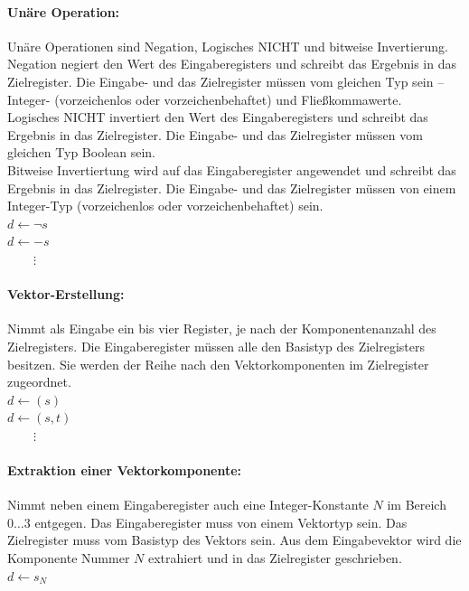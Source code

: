 \documentclass[twoside,a4paper,fleqn,12pt]{article}
\begin{document}
\paragraph{Unäre Operation:} Unäre Operationen sind Negation, Logisches NICHT und bitweise Invertierung.
Negation negiert den Wert des Eingaberegisters und schreibt das Ergebnis in das Zielregister.
Die Eingabe- und das Zielregister müssen vom gleichen Typ sein -- Integer- (vorzeichenlos oder vorzeichenbehaftet) und Fließkommawerte.\\
Logisches NICHT invertiert den Wert des Eingaberegisters und schreibt das Ergebnis in das Zielregister.
Die Eingabe- und das Zielregister müssen vom gleichen Typ Boolean sein.\\
Bitweise Invertiertung wird auf das Eingaberegister angewendet und schreibt das Ergebnis in das Zielregister.
Die Eingabe- und das Zielregister müssen von einem Integer-Typ (vorzeichenlos oder vorzeichenbehaftet) sein.
\\\hspace*{1cm}$d \gets \neg s$
\\\hspace*{1cm}$d \gets -s$
\\\hspace*{1cm}$\phantom{d \gets}\vdots$

\paragraph{Vektor-Erstellung:} Nimmt als Eingabe ein bis vier Register, je nach der Komponentenanzahl des Zielregisters. Die Eingaberegister müssen alle
den Basistyp des Zielregisters besitzen. Sie werden der Reihe nach den Vektorkomponenten im Zielregister zugeordnet.
\\\hspace*{1cm}$d \gets (s)$
\\\hspace*{1cm}$d \gets (s, t)$
\\\hspace*{1cm}$\phantom{d \gets}\vdots$

\paragraph{Extraktion einer Vektorkomponente:} Nimmt neben einem Eingaberegister auch eine Integer-Konstante $N$ im Bereich $0 \dots 3$ entgegen.
Das Eingaberegister muss von einem Vektortyp sein. Das Zielregister muss vom Basistyp des Vektors sein.
Aus dem Eingabevektor wird die Komponente Nummer $N$ extrahiert und in das Zielregister geschrieben.
\\\hspace*{1cm}$d \gets s_N$
\end{document}
